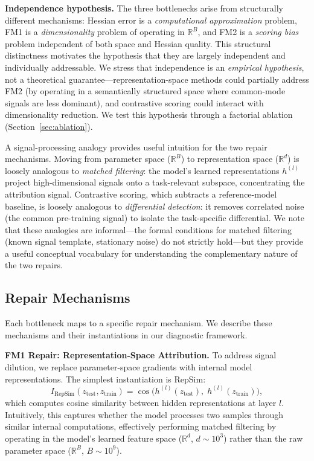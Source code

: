 \documentclass{article}
\begin{document}
\textbf{Independence hypothesis.} The three bottlenecks arise from structurally different mechanisms: Hessian error is a \emph{computational approximation} problem, FM1 is a \emph{dimensionality} problem of operating in $\mathbb{R}^B$, and FM2 is a \emph{scoring bias} problem independent of both space and Hessian quality. This structural distinctness motivates the hypothesis that they are largely independent and individually addressable. We stress that independence is an \emph{empirical hypothesis}, not a theoretical guarantee---representation-space methods could partially address FM2 (by operating in a semantically structured space where common-mode signals are less dominant), and contrastive scoring could interact with dimensionality reduction. We test this hypothesis through a factorial ablation (Section~\ref{sec:ablation}).

A signal-processing analogy provides useful intuition for the two repair mechanisms. Moving from parameter space ($\mathbb{R}^B$) to representation space ($\mathbb{R}^d$) is loosely analogous to \emph{matched filtering}: the model's learned representations $h^{(l)}$ project high-dimensional signals onto a task-relevant subspace, concentrating the attribution signal. Contrastive scoring, which subtracts a reference-model baseline, is loosely analogous to \emph{differential detection}: it removes correlated noise (the common pre-training signal) to isolate the task-specific differential. We note that these analogies are informal---the formal conditions for matched filtering (known signal template, stationary noise) do not strictly hold---but they provide a useful conceptual vocabulary for understanding the complementary nature of the two repairs.

\subsection{Repair Mechanisms}

Each bottleneck maps to a specific repair mechanism. We describe these mechanisms and their instantiations in our diagnostic framework.

\textbf{FM1 Repair: Representation-Space Attribution.} To address signal dilution, we replace parameter-space gradients with internal model representations. The simplest instantiation is RepSim:
\begin{equation}
I_\text{RepSim}(z_\text{test}, z_\text{train}) = \cos\bigl(h^{(l)}(z_\text{test}),\; h^{(l)}(z_\text{train})\bigr),
\label{eq:repsim}
\end{equation}
which computes cosine similarity between hidden representations at layer $l$. Intuitively, this captures whether the model processes two samples through similar internal computations, effectively performing matched filtering by operating in the model's learned feature space ($\mathbb{R}^d$, $d \sim 10^3$) rather than the raw parameter space ($\mathbb{R}^B$, $B \sim 10^9$).
\end{document}
